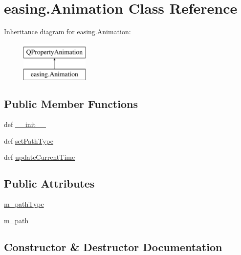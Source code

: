 \hypertarget{classeasing_1_1Animation}{}\section{easing.\+Animation Class Reference}
\label{classeasing_1_1Animation}
Inheritance diagram for easing.\+Animation\+:\begin{figure}[H]
\begin{center}
\leavevmode
\includegraphics[height=2.000000cm]{classeasing_1_1Animation}
\end{center}
\end{figure}
\subsection*{Public Member Functions}
\begin{DoxyCompactItemize}
\item 
def \hyperlink{classeasing_1_1Animation_a07559b7710c2c75cac05bc3ba916a443}{\+\_\+\+\_\+init\+\_\+\+\_\+}
\item 
def \hyperlink{classeasing_1_1Animation_a42fc502db0feb6fdcdc8044eb462b48a}{set\+Path\+Type}
\item 
def \hyperlink{classeasing_1_1Animation_a9d356559c285a1ae91cebebf607e041c}{update\+Current\+Time}
\end{DoxyCompactItemize}
\subsection*{Public Attributes}
\begin{DoxyCompactItemize}
\item 
\hyperlink{classeasing_1_1Animation_ab12abf69b1a0732c580389980cebc2c9}{m\+\_\+path\+Type}
\item 
\hyperlink{classeasing_1_1Animation_ae3f3f6fab552a9998f9149a6e3c922b7}{m\+\_\+path}
\end{DoxyCompactItemize}


\subsection{Constructor \& Destructor Documentation}
\hypertarget{classeasing_1_1Animation_a07559b7710c2c75cac05bc3ba916a443}{}
